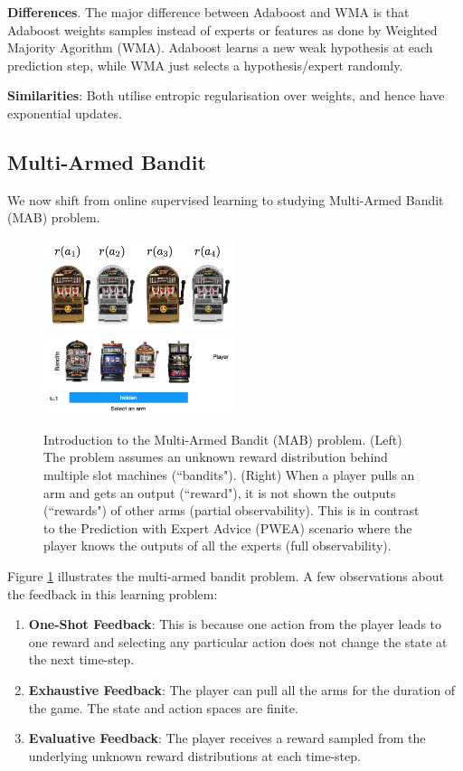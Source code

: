 \documentclass[11pt]{article}
\begin{document}
\textbf{Differences}. The major difference between Adaboost and WMA is that Adaboost weights samples instead of experts or features as done by Weighted Majority Agorithm (WMA). Adaboost learns a new weak hypothesis at each prediction step, while WMA just selects a hypothesis/expert randomly.

\textbf{Similarities}: Both utilise entropic regularisation over weights, and hence have exponential updates.

\subsection{Multi-Armed Bandit}
We now shift from online supervised learning to studying Multi-Armed Bandit (MAB) problem.
\begin{figure}[H]
    \centering
    \includegraphics[width=0.5\textwidth]{images/bandit_intro.png}%
    \includegraphics[width=0.5\textwidth]{images/bandit_pwea.png}
    \caption{Introduction to the Multi-Armed Bandit (MAB) problem. (Left) The problem assumes
    an unknown reward distribution behind multiple slot machines (``bandits"). (Right) When
    a player pulls an arm and gets an output (``reward"), it is not shown the outputs (``rewards") of other arms
    (partial observability).
    This is in contrast to the Prediction with Expert Advice (PWEA) scenario where the player
    knows the outputs of all the experts (full observability).}
    \label{fig:bandit}
\end{figure}

Figure \ref{fig:bandit} illustrates the multi-armed bandit problem. A few observations about the
feedback in this learning problem:
\begin{enumerate}
    \item \textbf{One-Shot Feedback}: This is because one action from the player leads to one
    reward and selecting any particular action does not change the state at the next time-step.
    \item \textbf{Exhaustive Feedback}: The player can pull all the arms for the duration of the
    game. The state and action spaces are finite.
    \item \textbf{Evaluative Feedback}: The player receives a reward sampled from the underlying
    unknown reward distributions at each time-step.
\end{enumerate}
\end{document}
